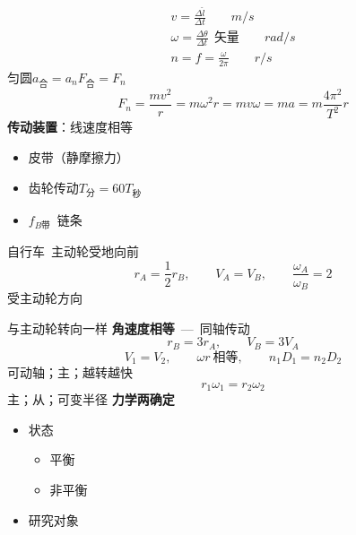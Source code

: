 \begin{gather*}
v=\frac{\Delta\widehat{l}}{\Delta t}\qquad \unit{m/s}\\
\omega=\frac{\Delta\theta}{\Delta t}\ \ \text{矢量}\qquad \unit{rad/s}\\
n=f=\frac{\omega}{2\pi}\qquad \unit{r/s}
\end{gather*}
匀圆\quad $a_{\text{合}}=a_n$\quad $F_{\text{合}}=F_n$
\[ F_n=\frac{mv^2}{r}=m\omega^2 r=mv\omega=ma=m\frac{4\pi^2}{T^2}r \]
\textbf{传动装置}：线速度相等
\begin{itemize}
\item 皮带（静摩擦力）
\item 齿轮传动\quad $T_{\text{分}}=60T_{\text{秒}}$\quad {}
\item $f_{B\text{带}}$\ 链条
\end{itemize}
自行车\ 主动轮\quad 受地向前
\[ r_A=\frac{1}{2}r_B,\qquad V_A=V_B,\qquad \frac{\omega_A}{\omega_B}=2 \]
受主动轮方向\par
与主动轮转向一样
\textbf{角速度相等}\ —\ 同轴传动
\[ r_B=3r_A,\qquad V_B=3V_A \]
\[ V_1=V_2,\qquad \omega r\ \text{相等},\qquad n_1D_1=n_2D_2 \]
可动轴；主；越转越快
\[ r_1\omega_1=r_2\omega_2 \]
主；从；可变半径
\textbf{力学两确定}
\begin{itemize}
\item 状态
  \begin{itemize}
  \item 平衡
  \item 非平衡
  \end{itemize}
\item 研究对象
\end{itemize}
